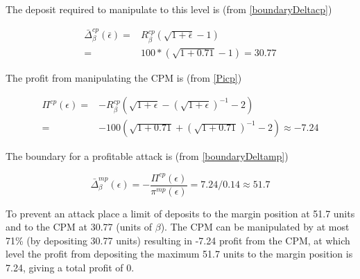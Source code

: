 \documentclass[12pt]{article}
\begin{document}
The deposit required to manipulate to this level is (from \ref{boundaryDeltacp})

\begin{eqnarray*}
\bar{\Delta}_\beta^{cp}(\bar{\epsilon})  =& R_\beta^{cp}(\sqrt{1+\bar{\epsilon}} -1) \\
                                         =& 100*(\sqrt{1+0.71}-1) = 30.77
\end{eqnarray*}

The profit from manipulating the CPM is (from \ref{Picp})

\begin{eqnarray*}
\Pi^{cp}(\epsilon) =&  -R_\beta^{cp} ( \sqrt{1+\epsilon}  - (\sqrt{1+\epsilon})^{-1}-2)\\  
                   =&  -100(\sqrt{1+0.71} + (\sqrt{1+0.71})^{-1} -2) \approx -7.24
\end{eqnarray*}

The boundary for a profitable attack is (from \ref{boundaryDeltamp})

\[ \bar{\Delta}_\beta^{mp}(\epsilon) = -\frac{\Pi^{cp}(\epsilon)}{\pi^{mp}(\epsilon) } = 7.24/0.14 \approx 51.7\]

To prevent an attack place a limit of deposits to the margin position at 51.7 units and to the CPM at 30.77 (units of $\beta$).  The CPM can be manipulated by at most 71\% (by depositing 30.77 units) resulting in -7.24 profit from the CPM, at which level the profit from depositing the maximum 51.7 units to the margin position is 7.24, giving a total profit of 0.






\singlespacing
\setlength\bibsep{0pt}





\clearpage

\onehalfspacing





\end{document}
